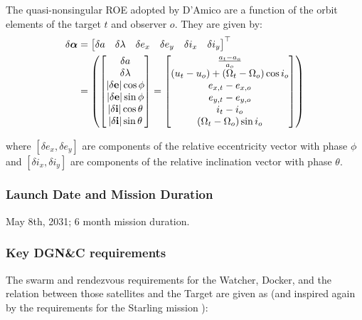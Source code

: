 The quasi-nonsingular ROE adopted by D'Amico \cite{damicothesis} are a function of the orbit elements of the target $t$ and observer $o$. They are given by:
\begin{align}
\delta \boldsymbol{\alpha} &= 
\begin{bmatrix} \label{eq:quasi_nonsign_roe}
\delta a & \delta \lambda & \delta e_x & \delta e_y & \delta i_x & \delta i_y
\end{bmatrix}^\top \notag \\
&= 
\left( 
\begin{bmatrix}
\delta a \\
\delta \lambda \\
|\delta\mathbf{e}| \cos \phi \\
|\delta\mathbf{e}| \sin \phi \\
|\delta\mathbf{i}| \cos \theta \\
|\delta\mathbf{i}| \sin \theta
\end{bmatrix}
= 
\begin{bmatrix}
\frac{a_t - a_o}{a_o} \\
(u_t - u_o) + (\Omega_t - \Omega_o) \cos i_o \\
e_{x,t} - e_{x,o} \\
e_{y,t} - e_{y,o} \\
i_t - i_o \\
(\Omega_t - \Omega_o) \sin i_o
\end{bmatrix}
\right)
\end{align}

where $[\delta e_x, \delta e_y]$ are components of the relative eccentricity vector with phase $\phi$ and $[\delta i_x, \delta i_y]$ are components of the relative inclination vector with phase $\theta$.    

\subsubsection{Launch Date and Mission Duration} 
May 8th, 2031; 6 month mission duration.

\subsubsection{Key DGN\&C requirements}


The swarm and rendezvous requirements for the Watcher, Docker, and the relation between those satellites and the Target are given as (and inspired again by the requirements for the Starling mission \cite{kruger2024starling}):

